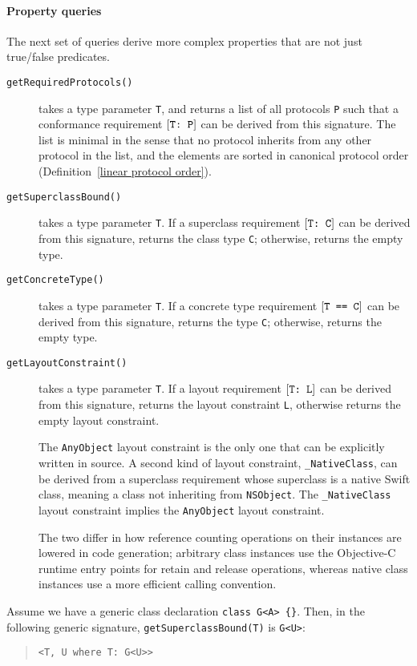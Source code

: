 \documentclass[../generics]{subfiles}
\begin{document}
\paragraph{Property queries}
The next set of queries derive more complex properties that are not just true/false predicates.
\begin{description}
\item [\texttt{getRequiredProtocols()}] takes a type parameter \texttt{T}, and returns a list of all protocols \texttt{P} such that a conformance requirement $[\texttt{T:~P}]$ can be derived from this signature. The list is minimal in the sense that no protocol inherits from any other protocol in the list, and the elements are sorted in canonical protocol order (Definition~\ref{linear protocol order}).
\item [\texttt{getSuperclassBound()}] takes a type parameter \texttt{T}. If a superclass requirement $[\texttt{T:~C}]$ can be derived from this signature, returns the class type \texttt{C}; otherwise, returns the empty type.
\item [\texttt{getConcreteType()}] takes a type parameter \texttt{T}. If a concrete type requirement $[\texttt{T == C}]$ can be derived from this signature, returns the type \texttt{C}; otherwise, returns the empty type.
\item [\texttt{getLayoutConstraint()}] takes a type parameter \texttt{T}. If a layout requirement $[\texttt{T:~L}]$ can be derived from this signature, returns the layout constraint \texttt{L}, otherwise returns the empty layout constraint.

The \texttt{AnyObject} layout constraint is the only one that can be explicitly written in source. A second kind of layout constraint, \texttt{\_NativeClass}, can be derived from a superclass requirement whose superclass is a native Swift class, meaning a class not inheriting from \texttt{NSObject}. The \texttt{\_NativeClass} layout constraint implies the \texttt{AnyObject} layout constraint.

The two differ in how reference counting operations on their instances are lowered in code generation; arbitrary class instances use the Objective-C runtime entry points for retain and release operations, whereas native class instances use a more efficient calling convention.
\end{description}

\begin{example}
Assume we have a generic class declaration \verb|class G<A> {}|. Then, in the following generic signature, \texttt{getSuperclassBound(T)} is \texttt{G<U>}:
\begin{quote}
\begin{verbatim}
<T, U where T: G<U>>
\end{verbatim}
\end{quote}
\end{example}
\end{document}
